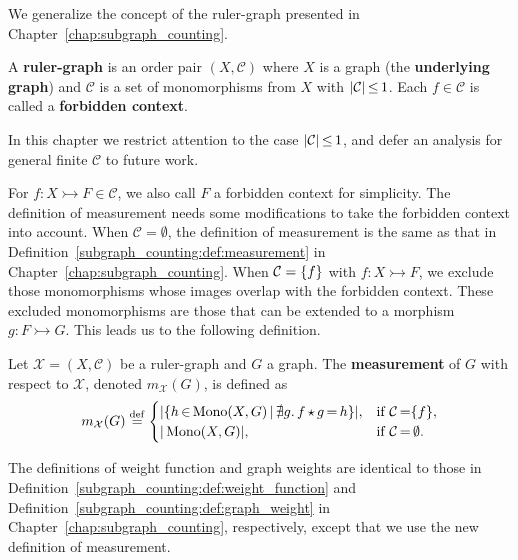 We generalize the concept of the ruler-graph presented in Chapter~\ref{chap:subgraph_counting}.

\begin{definition}
    \label{antipattern:def:ruler_graph}
    A \textbf{ruler-graph} is an order pair \( (X, \mathcal{C}) \) where $X$ is a graph (the \textbf{underlying graph}) and $\mathcal{C}$ is a set of monomorphisms from $X$ with $|\mathcal{C}|\mathop{\leq} 1$. Each $f \in \mathcal{C}$ is called a \textbf{forbidden context}.
\end{definition}
In this chapter we restrict attention to the case $|\mathcal{C}|\mathop{\leq} 1$, and defer an analysis for general finite $\mathcal{C}$ to future work.

For $f:X \rightarrowtail F \in \mathcal{C}$, we also call $F$ a forbidden context for simplicity.
The definition of measurement needs some modifications to take the forbidden context into account. When $\mathcal{C} \mathop{=} \emptyset$, the definition of measurement is the same as that in Definition~\ref{subgraph_counting:def:measurement} in Chapter~\ref{chap:subgraph_counting}. When $\mathcal{C} = \{f\}$ with $f:X \rightarrowtail F$, we exclude those monomorphisms whose images overlap with the forbidden context. These excluded monomorphisms are those that can be extended to a morphism $g: F \rightarrowtail G$. This leads us to the following definition.
\begin{definition} 
    \label{antipattern:def:measurement}
    Let \( \mathcal{X} = (X,\mathcal{C}) \) be a ruler-graph and \( G \) a graph. The \textbf{measurement} of \( G \) with respect to \( \mathcal{X}\), denoted \( m_\mathcal{X}(G) \), is defined as 
    \[
        m_\mathcal{X}(G) \overset{\operatorname{def}}{=}
        \begin{cases}
            |\{h \mathop{\in} \operatorname{Mono}(X,G) \mathop{\mid} \nexists g.\,f \mathop{\star} g \mathop{=} h \}|, & \text{if } \mathcal{C} \mathop{=}  \{f\}, \\
            |\operatorname{Mono}(X,G)|, & \text{if } \mathcal{C} \mathop{=} \emptyset.
        \end{cases}
    \]
\end{definition}
The definitions of weight function and graph weights are identical to those in Definition~\ref{subgraph_counting:def:weight_function} and Definition~\ref{subgraph_counting:def:graph_weight} in Chapter~\ref{chap:subgraph_counting}, respectively, except that we use the new definition of measurement.